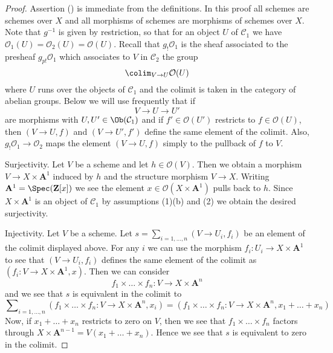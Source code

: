 \begin{proof}
Assertion () is immediate from the definitions.
In this proof all schemes are schemes over $X$ and all morphisms of
schemes are morphisms of schemes over $X$. Note that $g^{-1}$ is
given by restriction, so that for an object $U$ of $\mathcal{C}_1$
we have $\mathcal{O}_1(U) = \mathcal{O}_2(U) = \mathcal{O}(U)$.
Recall that $g_!\mathcal{O}_1$ is the sheaf associated to the presheaf
$g_{p!}\mathcal{O}_1$ which associates to $V$ in $\mathcal{C}_2$ the group
$$
\colim_{V \to U} \mathcal{O}(U)
$$
where $U$ runs over the objects of $\mathcal{C}_1$ and the colimit is
taken in the category of abelian groups. Below we will use frequently
that if
$$
V \to U \to U'
$$
are morphisms with $U, U' \in \Ob(\mathcal{C}_1)$
and if $f' \in \mathcal{O}(U')$ restricts to $f \in \mathcal{O}(U)$,
then $(V \to U, f)$ and $(V \to U', f')$ define the same element of the
colimit. Also, $g_!\mathcal{O}_1 \to \mathcal{O}_2$ maps the element
$(V \to U, f)$ simply to the pullback of $f$ to $V$.

\medskip\noindent
Surjectivity. Let $V$ be a scheme and let $h \in \mathcal{O}(V)$.
Then we obtain a morphism $V \to X \times \mathbf{A}^1$ induced by $h$
and the structure morphism $V \to X$. Writing
$\mathbf{A}^1 = \Spec(\mathbf{Z}[x])$ we see the element
$x \in \mathcal{O}(X \times \mathbf{A}^1)$ pulls
back to $h$. Since $X \times \mathbf{A}^1$ is an object of $\mathcal{C}_1$
by assumptions (1)(b) and (2) we obtain the desired surjectivity.

\medskip\noindent
Injectivity. Let $V$ be a scheme. Let
$s = \sum_{i = 1, \ldots, n} (V \to U_i, f_i)$ be an element of the colimit
displayed above. For any $i$ we can use the morphism
$f_i : U_i \to X \times \mathbf{A}^1$
to see that $(V \to U_i, f_i)$ defines the same element of the colimit as
$(f_i : V \to X \times \mathbf{A}^1, x)$. Then we can consider
$$
f_1 \times \ldots \times f_n : V \to X \times \mathbf{A}^n
$$
and we see that $s$ is equivalent in the colimit to
$$
\sum\nolimits_{i = 1, \ldots, n}
(f_1 \times \ldots \times f_n : V \to X \times \mathbf{A}^n, x_i) =
(f_1 \times \ldots \times f_n : V \to X \times \mathbf{A}^n,
x_1 + \ldots + x_n)
$$
Now, if $x_1 + \ldots + x_n$ restricts to zero on $V$, then we see
that $f_1 \times \ldots \times f_n$ factors through
$X \times \mathbf{A}^{n - 1} = V(x_1 + \ldots + x_n)$. Hence we see
that $s$ is equivalent to zero in the colimit.
\end{proof}











